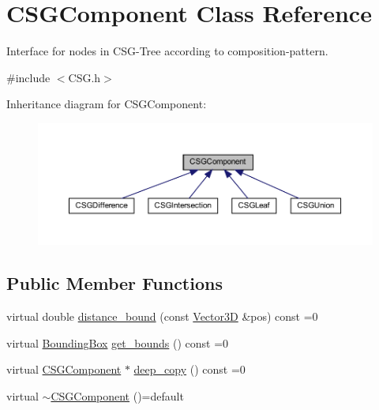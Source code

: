 \hypertarget{classCSGComponent}{}\section{C\+S\+G\+Component Class Reference}
\label{classCSGComponent}


Interface for nodes in C\+S\+G-\/\+Tree according to composition-\/pattern.  




{\ttfamily \#include $<$C\+S\+G.\+h$>$}



Inheritance diagram for C\+S\+G\+Component\+:
\nopagebreak
\begin{figure}[H]
\begin{center}
\leavevmode
\includegraphics[width=350pt]{classCSGComponent__inherit__graph}
\end{center}
\end{figure}
\subsection*{Public Member Functions}
\begin{DoxyCompactItemize}
\item 
virtual double \mbox{\hyperlink{classCSGComponent_a41ca7aff9b7c481ea076f81eeb826779}{distance\+\_\+bound}} (const \mbox{\hyperlink{classVector3D}{Vector3D}} \&pos) const =0
\item 
virtual \mbox{\hyperlink{classBoundingBox}{Bounding\+Box}} \mbox{\hyperlink{classCSGComponent_a4299365f2bab69272af9de4f2bee7cdb}{get\+\_\+bounds}} () const =0
\item 
virtual \mbox{\hyperlink{classCSGComponent}{C\+S\+G\+Component}} $\ast$ \mbox{\hyperlink{classCSGComponent_a98d3accd23c28259cbf490f4d7acbe83}{deep\+\_\+copy}} () const =0
\item 
virtual \mbox{\hyperlink{classCSGComponent_ab46aa06021795ff83ff2fdf991e5e77d}{$\sim$\+C\+S\+G\+Component}} ()=default
\end{DoxyCompactItemize}



